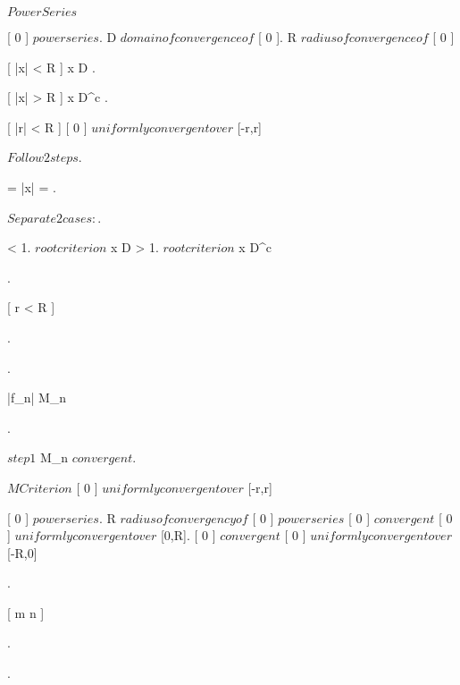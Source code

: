 \unit{ $Power Series$ }
{

	{
	{
		 $ power series $.
		D $ domain of convergence of $ [ 0 ].
		R $ radius of convergence of $  
	}
	\holds
	{
		[ |x| < R ]
		{
			x \in D
		}.

		[ |x| > R ]
		{
			x \in D^c
		}.

		[ |r| < R ]
		{
			[ 0 ] $ uniformly convergent over $ [-r,r]
		}
	}
	\demonstration
	{
		$ Follow 2 steps $.
		
		{
			{
				 = |x| = .

				$ Separate 2 cases: $.
				
				{
					 < 1.
					$ root criterion $ \imp x \in D
				}
				{
					 > 1.
					$ root criterion $ \imp x \in D^c
				}
			}
		}.
		
		{
			{
				{
					.

 					.

 					|f_n| \leq M_n 
				}.

				$step 1$ \imp M_n $ convergent $.

				$M Criterion$ \imp {}[ 0 ] $ uniformly convergent over $ [-r,r]
			}
		}
	}}



	{	
	{
		 $ power series $.
		R $ radius of convergency of $  $ power series $
	}
	\holds
	{
		 $ convergent $ \imp {} $ uniformly convergent over $ [0,R].
		 $ convergent $ \imp {} $ uniformly convergent over $ [-R,0]
	}
	\demonstration
	{
		{
			 \in \R.

			[ m \geq n ]
			{
			}
		}.

		{
		}.

}}}

